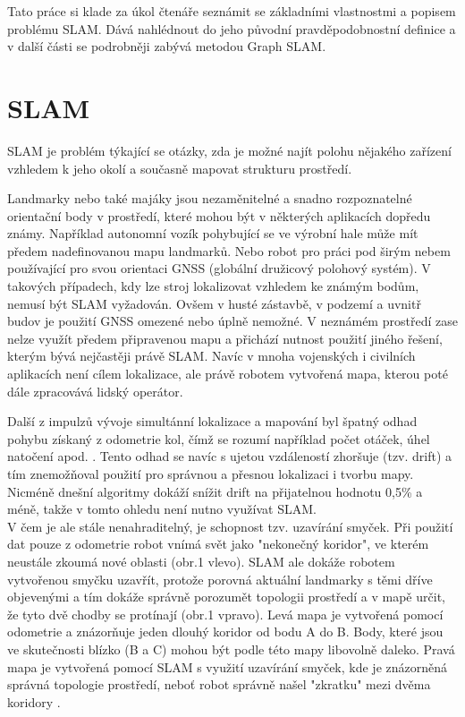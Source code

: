 \documentclass[12pt,a4paper]{article}
\begin{document}
Tato práce si klade za úkol čtenáře seznámit se základními vlastnostmi a popisem problému SLAM. Dává nahlédnout do jeho původní pravděpodobnostní definice a v další části se podrobněji zabývá metodou Graph SLAM. 


\newpage
\section{SLAM}
SLAM je problém týkající se otázky, zda je možné najít polohu nějakého zařízení vzhledem k jeho okolí a současně mapovat strukturu prostředí.

Landmarky nebo také majáky jsou nezaměnitelné a snadno rozpoznatelné orientační body v prostředí, které mohou být v některých aplikacích dopředu známy. Například autonomní vozík pohybující se ve výrobní hale může mít předem nadefinovanou mapu landmarků. Nebo robot pro práci pod širým nebem používající pro svou orientaci GNSS (globální družicový polohový systém). V takových případech, kdy lze stroj lokalizovat vzhledem ke známým bodům, nemusí být SLAM vyžadován. Ovšem v husté zástavbě, v podzemí a uvnitř budov je použití GNSS omezené nebo úplně nemožné. V neznámém prostředí zase nelze využít předem připravenou mapu a přichází nutnost použití jiného řešení, kterým bývá nejčastěji právě SLAM. Navíc v mnoha vojenských i civilních aplikacích není cílem lokalizace, ale právě robotem vytvořená mapa, kterou poté dále zpracovává lidský operátor.

Další z impulzů vývoje simultánní lokalizace a mapování byl špatný odhad pohybu získaný z odometrie kol, čímž se rozumí například počet otáček, úhel natočení apod. \cite{Past_Present_and_Future_of_Simultaneous_Localization_And_Mapping}. Tento odhad se navíc s ujetou vzdáleností zhoršuje (tzv. drift) a tím znemožňoval použití pro správnou a přesnou lokalizaci i tvorbu mapy. Nicméně dnešní algoritmy dokáží snížit drift na přijatelnou hodnotu 0,5\% a méně, takže v tomto ohledu není nutno využívat SLAM. \\ V čem je ale stále nenahraditelný, je schopnost tzv. uzavírání smyček. Při použití dat pouze z odometrie robot vnímá svět jako "nekonečný koridor", ve kterém neustále zkoumá nové oblasti (obr.1 vlevo). SLAM ale dokáže robotem vytvořenou smyčku uzavřít, protože porovná aktuální landmarky s těmi dříve objevenými a tím dokáže správně porozumět topologii prostředí a v mapě určit, že tyto dvě chodby se protínají (obr.1 vpravo). Levá mapa je vytvořená pomocí odometrie a znázorňuje jeden dlouhý koridor od bodu A do B. Body, které jsou ve skutečnosti blízko (B a C) mohou být podle této mapy libovolně daleko. Pravá mapa je vytvořená pomocí SLAM s využití uzavírání smyček, kde je znázorněná správná topologie prostředí, neboť robot správně našel "zkratku" mezi dvěma koridory \cite{Past_Present_and_Future_of_Simultaneous_Localization_And_Mapping}.
\end{document}

